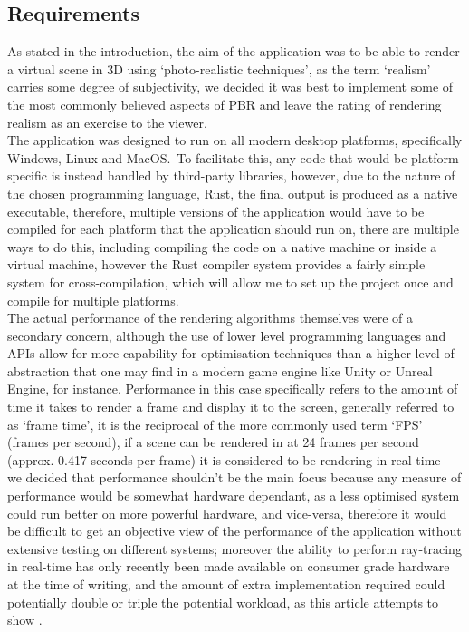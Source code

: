 \documentclass[../report.tex]{subfiles}
\begin{document}
\subsection{Requirements}
As stated in the introduction, the aim of the application was to be able to render a virtual scene in 3D using `photo-realistic techniques', 
as the term `realism' carries some degree of subjectivity, we decided it was best to implement some of the most commonly believed aspects of PBR and leave the rating of
rendering realism as an exercise to the viewer. \\

The application was designed to run on all modern desktop platforms, specifically Windows, Linux and MacOS.\ To facilitate this, any code that
would be platform specific is instead handled by third-party libraries,
however, due to the nature of the chosen programming 
language, Rust, the final output is produced as a native executable, therefore, 
multiple versions of the application would have to be compiled for each platform
that the application should run on, there are multiple ways to do this, including compiling the code on a native machine or inside a virtual machine, 
however the Rust compiler system provides a fairly simple system for cross-compilation, which will allow me to set up the project once and compile for multiple platforms. \\


The actual performance of the rendering algorithms themselves were of a secondary concern, although the use of lower level programming languages and APIs allow 
for more capability for optimisation techniques than a higher level of abstraction that one may find in a modern game engine like Unity or Unreal Engine, for instance. 
Performance in this case specifically refers to the amount of time it takes to render a frame and display it to the screen, 
generally referred to as `frame time', it is the reciprocal of the more commonly used term `FPS' (frames per second), 
if a scene can be rendered in at 24 frames per second (approx. 0.417 seconds per frame) it is considered to be rendering in real-time  \\

we decided that performance shouldn't be the main focus because any measure of performance would be somewhat hardware dependant, as a less optimised system 
could run better on more powerful hardware, and vice-versa, therefore it would be difficult to get an objective view of the 
performance of the application without extensive testing on different systems; moreover the ability to perform ray-tracing 
in real-time has only recently been made available on consumer grade hardware at the time of writing, and the amount of extra
implementation required could potentially double or triple the potential workload, as this article attempts to show .
\end{document}
